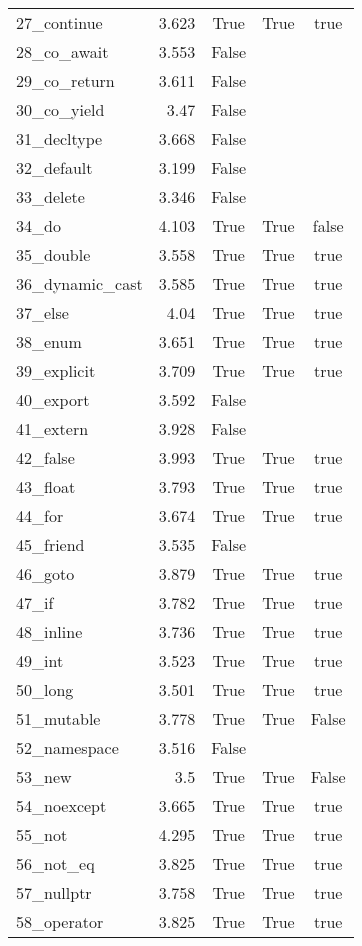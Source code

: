 \documentclass{article}
\begin{document}
\begin{longtable}{lrccc}
27\_continue & 3.623& True& True& true \\[0.5ex]
28\_co\_await & 3.553& False \\[0.5ex]
29\_co\_return & 3.611& False \\[0.5ex]
30\_co\_yield & 3.47& False \\[0.5ex]
31\_decltype & 3.668& False \\[0.5ex]
32\_default & 3.199& False \\[0.5ex]
33\_delete & 3.346& False \\[0.5ex]
34\_do & 4.103& True& True& false \\[0.5ex]
35\_double & 3.558& True& True& true \\[0.5ex]
36\_dynamic\_cast & 3.585& True& True& true \\[0.5ex]
37\_else & 4.04& True& True& true \\[0.5ex]
38\_enum & 3.651& True& True& true \\[0.5ex]
39\_explicit & 3.709& True& True& true \\[0.5ex]
40\_export & 3.592& False \\[0.5ex]
41\_extern & 3.928& False \\[0.5ex]
42\_false & 3.993& True& True& true \\[0.5ex]
43\_float & 3.793& True& True& true \\[0.5ex]
44\_for & 3.674& True& True& true \\[0.5ex]
45\_friend & 3.535& False \\[0.5ex]
46\_goto & 3.879& True& True& true \\[0.5ex]
47\_if & 3.782& True& True& true \\[0.5ex]
48\_inline & 3.736& True& True& true \\[0.5ex]
49\_int & 3.523& True& True& true \\[0.5ex]
50\_long & 3.501& True& True& true \\[0.5ex]
51\_mutable & 3.778& True& True& False \\[0.5ex]
52\_namespace & 3.516& False \\[0.5ex]
53\_new & 3.5& True& True& False \\[0.5ex]
54\_noexcept & 3.665& True& True& true \\[0.5ex]
55\_not & 4.295& True& True& true \\[0.5ex]
56\_not\_eq & 3.825& True& True& true \\[0.5ex]
57\_nullptr & 3.758& True& True& true \\[0.5ex]
58\_operator & 3.825& True& True& true \\[0.5ex]

\end{longtable}
\end{document}
